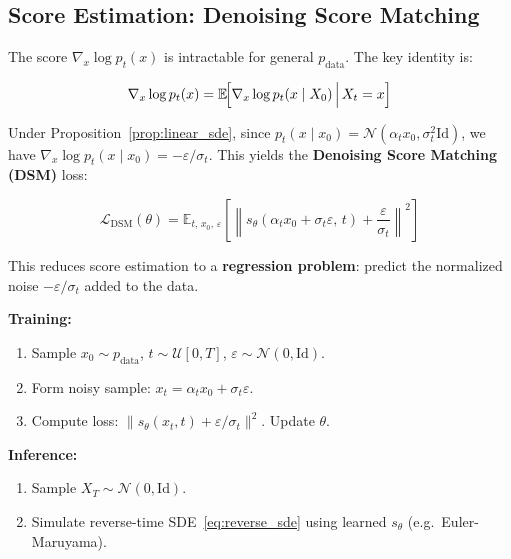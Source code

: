 \documentclass[11pt, a4paper]{article}
\newcommand{\E}{\mathbb{E}}
\newcommand{\Id}{\mathrm{Id}}
\newcommand{\pdata}{p_{\mathrm{data}}}
\newcommand{\grad}{\nabla}
\theoremstyle{plain}
\theoremstyle{definition}
\theoremstyle{remark}
\begin{document}
\subsection{Score Estimation: Denoising Score Matching}

The score $\grad_x \log p_t(x)$ is intractable for general $\pdata$. The key identity is:

\begin{thmbox}
\begin{equation}
  \grad_x \log p_t(x) = \E\!\Bigl[\grad_x \log p_t(x \mid X_0) \,\Big|\, X_t = x\Bigr]
  \label{eq:tweedie}
\end{equation}
\end{thmbox}

Under Proposition~\ref{prop:linear_sde}, since $p_t(x \mid x_0) = \mathcal{N}(\alpha_t x_0, \sigma_t^2 \Id)$, we have $\grad_x \log p_t(x \mid x_0) = -\varepsilon/\sigma_t$. This yields the \textbf{Denoising Score Matching (DSM)} loss:

\begin{equation}
  \mathcal{L}_{\mathrm{DSM}}(\theta) = \E_{t,\, x_0,\, \varepsilon}\!\left[
  \left\|s_\theta(\alpha_t x_0 + \sigma_t \varepsilon,\, t) + \frac{\varepsilon}{\sigma_t}\right\|^2
  \right]
  \label{eq:dsm}
\end{equation}

This reduces score estimation to a \textbf{regression problem}: predict the normalized noise $-\varepsilon/\sigma_t$ added to the data.

\begin{algobox}
\textbf{Training:}
\begin{enumerate}
  \item Sample $x_0 \sim \pdata$, $t \sim \mathcal{U}[0,T]$, $\varepsilon \sim \mathcal{N}(0,\Id)$.
  \item Form noisy sample: $x_t = \alpha_t x_0 + \sigma_t \varepsilon$.
  \item Compute loss: $\|s_\theta(x_t, t) + \varepsilon/\sigma_t\|^2$. Update $\theta$.
\end{enumerate}
\textbf{Inference:}
\begin{enumerate}
  \item Sample $X_T \sim \mathcal{N}(0,\Id)$.
  \item Simulate reverse-time SDE~\eqref{eq:reverse_sde} using learned $s_\theta$ (e.g.\ Euler-Maruyama).
\end{enumerate}
\end{algobox}
\end{document}
